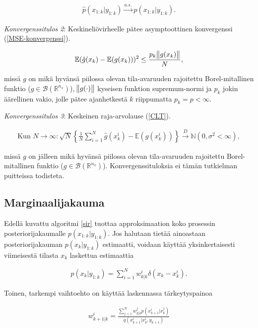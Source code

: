 \documentclass[
  12pt,
  a4paper, twoside]{book}
\begin{document}
\begin{align}\label{jakaumakonvergenssi}
\hat{p}(x_{1:k}|y_{1:k}) \xrightarrow{a.s.} p(x_{1:k}|y_{1:k}).
\end{align}

\textit{Konvergenssitulos 2}: Keskineliövirheelle pätee asymptoottinen konvergenssi (\ref{MSE-konvergenssi}).

\begin{align}\label{MSE-konvergenssi}
\mathbb{E}(\hat{g}(x_k)-\mathbb{E}(g(x_k)))^2\leq\frac{p_k\norm{g(x_k)}}{N},
\end{align}

\noindent missä \(g\) on mikä hyvänsä piilossa olevan tila-avaruuden rajoitettu Borel-mitallinen funktio (\(g \in \mathcal{B}(\mathbb{R}^{n_x})\)), \(\norm{g(\cdot)}\) kyseisen funktion supremum-normi ja \(p_k\) jokin äärellinen vakio, jolle pätee ajanhetkestä \(k\) riippumatta \(p_k=p<\infty\).

\textit{Konvergenssitulos 3}: Keskeinen raja-arvolause (\ref{CLT}).

\begin{align}\label{CLT}
\text{Kun } N \to \infty: \sqrt{N} \left\{ \frac{1}{N} \sum_{i=1}^N \hat{g}(x_k^i) -\mathbb{E}(g(x_k^i)) \right\} \xrightarrow{D} \mathbb{N}(0,\sigma^2 < \infty),
\end{align}

missä \(g\) on jälleen mikä hyvänsä piilossa olevan tila-avaruuden rajoitettu Borel-mitallinen funktio (\(g \in \mathcal{B}(\mathbb{R}^{n_x})\)). Konvergenssituloksia ei tämän tutkielman puitteissa todisteta.

\subsection{Marginaalijakauma}

Edellä kuvattu algoritmi \ref{sir} tuottaa approksimaation koko prosessin posteriorijakaumalle \(p(x_{1:k}|y_{1:k})\). Jos halutaan tietää ainoastaan posteriorijakauman \(p(x_k|y_{1:k})\) estimaatti, voidaan käyttää yksinkertaisesti viimeisestä tilasta \(x_k\) laskettua estimaattia

\begin{align}
\hat{p}(x_{k}|y_{1:k})=\sum_{i=1}^{N}w_{k|k}^i \delta(x_{k}-x_{k}^i).
\end{align}

Toinen, tarkempi vaihtoehto on käyttää laskennassa tärkeytyspainoa

\begin{align}\label{marginaalitarkeytys}
w_{k+1|k}^i=\frac{\sum_{j=1}^{N}w_{k|k}^jp(x_{k+1}^i|x_k^j)}{q(x_{k+1}^i|x_k^i,y_{k+1})}
\end{align}
\end{document}
